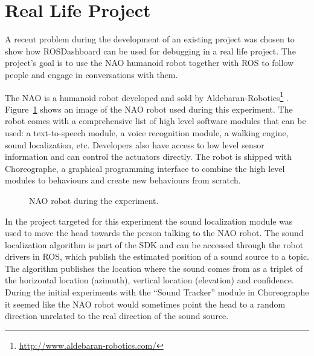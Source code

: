 \section{Real Life Project}
\label{plot_widget_section}
A recent problem during the development of an existing project was chosen to show how ROSDashboard can be used for debugging in a real life project. The project's goal is to use the NAO humanoid robot together with ROS to follow people and engage in conversations with them.

The NAO is a humanoid robot developed and sold by Aldebaran-Robotics\footnote{\url{http://www.aldebaran-robotics.com/}} \cite{Gouaillier2008}. Figure~\ref{nao_coffee} shows an image of the NAO robot used during this experiment. The robot comes with a comprehensive list of high level software modules that can be used: a text-to-speech module, a voice recognition module, a walking engine, sound localization, etc. Developers also have access to low level sensor information and can control the actuators directly. The robot is shipped with Choreographe, a graphical programming interface to combine the high level modules to behaviours and create new behaviours from scratch.

\begin{figure}[htpb]
  \centering
  \caption{NAO robot during the experiment.}
  \label{nao_coffee}
\end{figure}

In the project targeted for this experiment the sound localization module was used to move the head towards the person talking to the NAO robot. The sound localization algorithm is part of the SDK and can be accessed through the robot drivers in ROS, which publish the estimated position of a sound source to a topic. The algorithm publishes the location where the sound comes from as a triplet of the horizontal location (azimuth), vertical location (elevation) and confidence. During the initial experiments with the ``Sound Tracker'' module in Choreographe it seemed like the NAO robot would sometimes point the head to a random direction unrelated to the real direction of the sound source.

